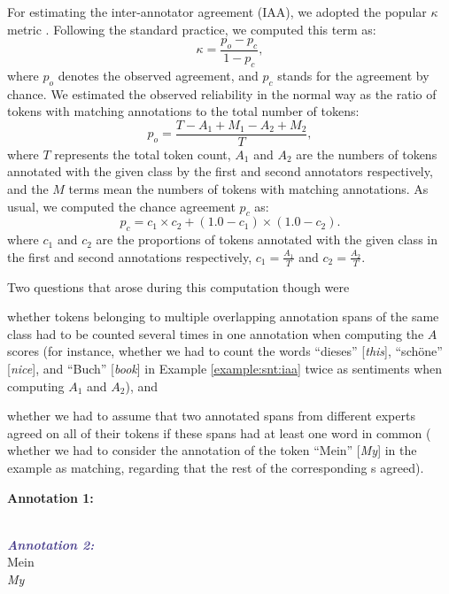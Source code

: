 For estimating the inter-annotator agreement (IAA), we adopted the
popular $\kappa$ metric \cite{Cohen:60}.  Following the standard
practice, we computed this term as:
\begin{equation*}
  \kappa = \frac{p_o - p_c}{1 - p_c},
\end{equation*}
where $p_o$ denotes the observed agreement, and $p_c$ stands for the
agreement by chance.  We estimated the observed reliability in the
normal way as the ratio of tokens with matching annotations to the
total number of tokens:
\begin{equation*}
  p_o = \frac{T - A_1 + M_1 - A_2 + M_2}{T},
\end{equation*}
where $T$ represents the total token count, $A_1$ and $A_2$ are the
numbers of tokens annotated with the given class by the first and
second annotators respectively, and the $M$ terms mean the numbers of
tokens with matching annotations.  As usual, we computed the chance
agreement $p_c$ as:
\begin{equation*}\textstyle
  p_c = c_1 \times c_2 + (1.0 - c_1) \times (1.0 - c_2).
\end{equation*}
where $c_1$ and $c_2$ are the proportions of tokens annotated with the
given class in the first and second annotations respectively, \ie{}
$c_1 = \frac{A_1}{T}$ and $c_2 = \frac{A_2}{T}$.

Two questions that arose during this computation though were
\begin{inparaenum}[(i)]
  \item whether tokens belonging to multiple overlapping annotation
    spans of the same class had to be counted several times in one
    annotation when computing the $A$ scores (for instance, whether we
    had to count the words ``dieses'' [\textit{this}], ``sch\"one''
    [\textit{nice}], and ``Buch'' [\textit{book}] in Example
    \ref{example:snt:iaa} twice as sentiments when computing $A_1$ and
    $A_2$), and
  \item whether we had to assume that two annotated spans from
    different experts agreed on all of their tokens if these spans had
    at least one word in common (\eg{} whether we had to consider the
    annotation of the token ``Mein'' [\textit{My}] in the example as
    matching, regarding that the rest of the corresponding
    s agreed).
\end{inparaenum}

\begin{example}\label{example:snt:iaa}
\textcolor{red3}{\textbf{Annotation 1:}}\\
\upshape{}\\

\noindent\textcolor{darkslateblue}{\textbf{\itshape Annotation 2:}}\\
Mein \\
\itshape My \upshape{}
\end{example}

